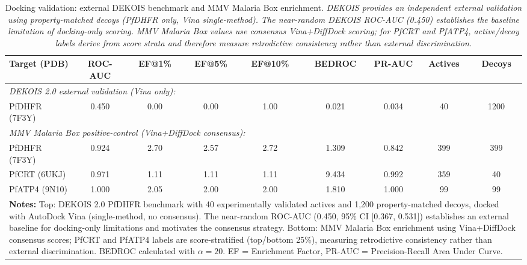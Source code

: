 
\begin{table}[!htbp]
\centering
\caption{Docking validation: external DEKOIS benchmark and MMV Malaria Box enrichment. \textit{DEKOIS provides an independent external validation using property-matched decoys (PfDHFR only, Vina single-method). The near-random DEKOIS ROC-AUC (0.450) establishes the baseline limitation of docking-only scoring. MMV Malaria Box values use consensus Vina+DiffDock scoring; for PfCRT and PfATP4, active/decoy labels derive from score strata and therefore measure retrodictive consistency rather than external discrimination.}}
\label{tab:sm_enrichment_validation}
\scriptsize
\begin{tabular}{lcccccccc}
\toprule
\textbf{Target (PDB)} & \textbf{ROC-AUC} & \textbf{EF@1\%} & \textbf{EF@5\%} & \textbf{EF@10\%} & \textbf{BEDROC} & \textbf{PR-AUC} & \textbf{Actives} & \textbf{Decoys} \\
\midrule
\multicolumn{9}{l}{\textit{DEKOIS 2.0 external validation (Vina only):}} \\
PfDHFR (7F3Y) & \num{0.450} & \num{0.00} & \num{0.00} & \num{1.00} & \num{0.021} & \num{0.034} & \num{40} & \num{1200} \\
\midrule
\multicolumn{9}{l}{\textit{MMV Malaria Box positive-control (Vina+DiffDock consensus):}} \\
PfDHFR (7F3Y) & \num{0.924} & \num{2.70} & \num{2.57} & \num{2.72} & \num{1.309} & \num{0.842} & \num{399} & \num{399} \\
PfCRT (6UKJ) & \num{0.971} & \num{1.11} & \num{1.11} & \num{1.11} & \num{9.434} & \num{0.992} & \num{359} & \num{40} \\
PfATP4 (9N10) & \num{1.000} & \num{2.05} & \num{2.00} & \num{2.00} & \num{1.810} & \num{1.000} & \num{99} & \num{99} \\
\bottomrule
\multicolumn{9}{p{15cm}}{
\noindent\textbf{Notes:} Top: DEKOIS 2.0 PfDHFR benchmark with 40 experimentally validated actives and 1,200 property-matched decoys, docked with AutoDock Vina (single-method, no consensus). The near-random ROC-AUC (0.450, 95\% CI [0.367, 0.531]) establishes an external baseline for docking-only limitations and motivates the consensus strategy. Bottom: MMV Malaria Box enrichment using Vina+DiffDock consensus scores; PfCRT and PfATP4 labels are score-stratified (top/bottom 25\%), measuring retrodictive consistency rather than external discrimination. BEDROC calculated with $\alpha = 20$. EF = Enrichment Factor, PR-AUC = Precision-Recall Area Under Curve.}
\end{tabular}
\end{table}
